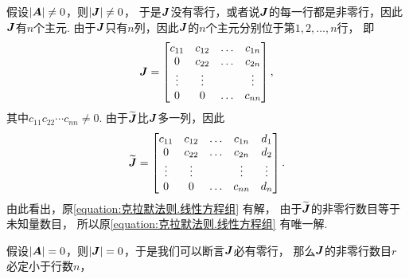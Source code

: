 假设\(\abs{\boldsymbol{A}}\neq0\)，则\(\abs{\boldsymbol{J}}\neq0\)，
于是\(\boldsymbol{J}\)没有零行，或者说\(\boldsymbol{J}\)的每一行都是非零行，因此\(\boldsymbol{J}\)有\(n\)个主元.
由于\(\boldsymbol{J}\)只有\(n\)列，因此\(\boldsymbol{J}\)的\(n\)个主元分别位于第\(1,2,\dotsc,n\)行，
即\[
	\boldsymbol{J} = \begin{bmatrix}
		c_{11} & c_{12} & \dots & c_{1n} \\
		0 & c_{22} & \dots & c_{2n} \\
		\vdots & \vdots & & \vdots \\
		0 & 0 & \dots & c_{nn}
	\end{bmatrix},
\]
其中\(c_{11} c_{22} \dotsm c_{nn} \neq 0\).
由于\(\widetilde{\boldsymbol{J}}\)比\(\boldsymbol{J}\)多一列，因此\[
	\widetilde{\boldsymbol{J}} = \begin{bmatrix}
		c_{11} & c_{12} & \dots & c_{1n} & d_1 \\
		0 & c_{22} & \dots & c_{2n} & d_2 \\
		\vdots & \vdots & & \vdots & \vdots \\
		0 & 0 & \dots & c_{nn} & d_n
	\end{bmatrix}.
\]
由此看出，原\cref{equation:克拉默法则.线性方程组} 有解，
由于\(\widetilde{\boldsymbol{J}}\)的非零行数目等于未知量数目，
所以原\cref{equation:克拉默法则.线性方程组} 有唯一解.

假设\(\abs{\boldsymbol{A}}=0\)，则\(\abs{\boldsymbol{J}}=0\)，于是我们可以断言\(\boldsymbol{J}\)必有零行，
那么\(\boldsymbol{J}\)的非零行数目\(r\)必定小于行数\(n\)，

